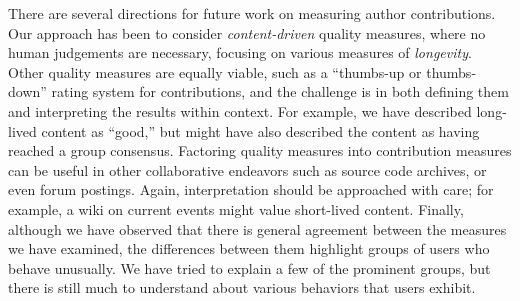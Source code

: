There are several directions for future work on measuring
author contributions.
Our approach has been to consider \textit{content-driven}
quality measures, where no human judgements are necessary,
focusing on various measures of \textit{longevity}.
Other quality measures are equally viable, such as
a ``thumbs-up or thumbs-down'' rating system for
contributions, and the challenge is in both defining
them and interpreting the results within context.
For example, we have described long-lived content as
``good,'' but might have also described the content
as having reached a group consensus.
Factoring quality measures into contribution measures
can be useful in other collaborative endeavors
such as source code archives, or even forum postings.
Again, interpretation should be approached with care;
for example, a wiki on current events might value
short-lived content.
Finally, although we have observed that there is general
agreement between the measures we have examined,
the differences between them highlight groups of
users who behave unusually.
We have tried to explain a few of the prominent groups,
but there is still much to understand about
various behaviors that users exhibit.

